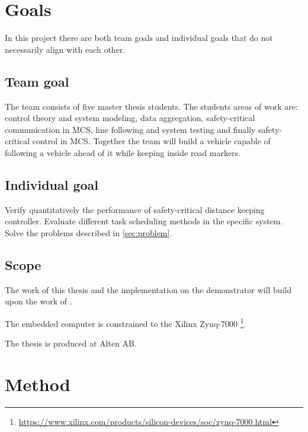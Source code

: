 
\section{Goals}
In this project there are both team goals and individual goals that do not necessarily align with each other. 

\subsection{Team goal}
The team consists of five master thesis students. The students areas of work are: control theory and system modeling, data aggregation, safety-critical communication in MCS, line following and system testing and finally safety-critical control in MCS. Together the team will build a vehicle capable of following a vehicle ahead of it while keeping inside road markers.

\subsection{Individual goal}
Verify quantitatively the performance of safety-critical distance keeping controller. Evaluate different task scheduling methods in the specific system. Solve the problems described in \ref{sec:problem}.

\subsection{Scope}
\label{sec:scope}
The work of this thesis and the implementation on the demonstrator will build upon the work of \cite{zaki2016}.

The embedded computer is constrained to the Xilinx Zynq-7000 \footnote{\url{https://www.xilinx.com/products/silicon-devices/soc/zynq-7000.html}}. 

The thesis is produced at Alten AB.

\section{Method}
